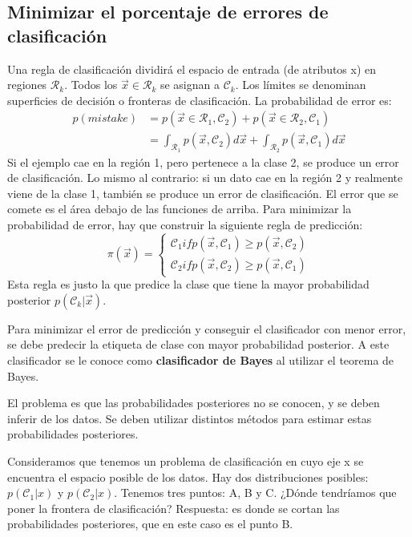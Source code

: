 \subsection{Minimizar el porcentaje de errores de clasificación}
Una regla de clasificación dividirá el espacio de entrada (de atributos x) en regiones $\mathcal{R}_k$. Todos los $\vec{x} \in \mathcal{R}_k$ se asignan a $\mathcal{C}_k$. Los límites se denominan superficies de decisión o fronteras de clasificación. La probabilidad de error es:
\begin{align*}
p(mistake) &= p(\vec{x} \in \mathcal{R}_1, \mathcal{C}_2) + p(\vec{x} \in \mathcal{R}_2, \mathcal{C}_1) \\
& = \int_{\mathcal{R}_1} p(\vec{x}, \mathcal{C}_2) d\vec{x} + \int_{\mathcal{R}_2} p(\vec{x}, \mathcal{C}_1) d \vec{x}
\end{align*}
Si el ejemplo cae en la región 1, pero pertenece a la clase 2, se produce un error de clasificación. Lo mismo al contrario: si un dato cae en la región 2 y realmente viene de la clase 1, también se produce un error de clasificación. El error que se comete es el área debajo de las funciones de arriba. Para minimizar la probabilidad de error, hay que construir la siguiente regla de predicción:
$$\pi(\vec{x}) = \begin{cases}
\mathcal{C}_1 if p(\vec{x}, \mathcal{C}_1) \geq p(\vec{x}, \mathcal{C}_2) \\
\mathcal{C}_2 if p(\vec{x}, \mathcal{C}_2) \geq p(\vec{x}, \mathcal{C}_1) 
\end{cases}
$$
Esta regla es justo la que predice la clase que tiene la mayor probabilidad posterior $p(\mathcal{C}_k | \vec{x})$.

Para minimizar el error de predicción y conseguir el clasificador con menor error, se debe predecir la etiqueta de clase con mayor probabilidad posterior. A este clasificador se le conoce como \textbf{clasificador de Bayes} al utilizar el teorema de Bayes.

El problema es que las probabilidades posteriores no se conocen, y se deben inferir de los datos. Se deben utilizar distintos métodos para estimar estas probabilidades posteriores.

Consideramos que tenemos un problema de clasificación en cuyo eje x se encuentra el espacio posible de los datos. Hay dos distribuciones posibles: $p(\mathcal{C}_1|x)$ y $p(\mathcal{C}_2|x)$. Tenemos tres puntos: A, B y C. ¿Dónde tendríamos que poner la frontera de clasificación? Respuesta: es donde se cortan las probabilidades posteriores, que en este caso es el punto B.

